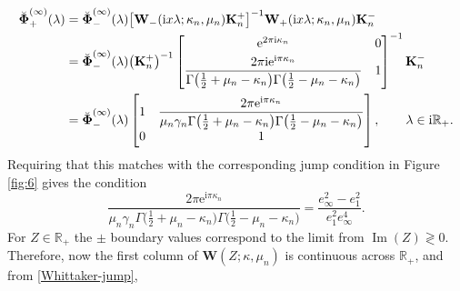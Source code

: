 \documentclass[pdftex]{sigma}
\numberwithin{equation}{section}
\newcommand{\ee}{\mathrm{e}}
\newcommand{\ii}{\mathrm{i}}
\newcommand{\para}[1]{\breve{#1}}
\newcommand{\R}{{\mathbb{R}}}
\newcommand{\im}{\operatorname{Im}}
\begin{document}
\begin{align*}
 \para{\boldsymbol{\Phi}}_+^{(\infty)}(\lambda)&=\para{\boldsymbol{\Phi}}_-^{(\infty)}(\lambda)\big[\mathbf{W}_-(\ii x\lambda;\kappa_n,\mu_n)\mathbf{K}_n^{+}\big]^{-1}\mathbf{W}_+(\ii x\lambda;\kappa_n,\mu_n)\mathbf{K}_n^-\\
 &=\para{\boldsymbol{\Phi}}_-^{(\infty)}(\lambda)
 \big(\mathbf{K}^+_n\big)^{-1}
 \begin{bmatrix}
 \ee^{2\pi \ii\kappa_n} & 0\vspace{1mm}\\
 \displaystyle \frac{2\pi \ii\ee^{\ii\pi\kappa_n}}{\Gamma\big(\frac{1}{2}+\mu_n-\kappa_n\big)\Gamma\big(\frac{1}{2}-\mu_n-\kappa_n\big)} & 1
 \end{bmatrix}^{-1}
 \mathbf{K}^-_n\\
 &=\para{\boldsymbol{\Phi}}_-^{(\infty)}(\lambda)\begin{bmatrix}
 1 & \displaystyle\frac{2\pi \ee^{\ii\pi\kappa_n}}{\mu_n\gamma_n\Gamma\big(\frac{1}{2}+\mu_n-\kappa_n\big)\Gamma\big(\frac{1}{2}-\mu_n-\kappa_n\big)}\\
 0 & 1
 \end{bmatrix},\qquad \lambda\in \ii\mathbb{R}_+.
\end{align*}
Requiring that this matches with the corresponding jump condition in Figure \ref{fig:6} gives the condition
\begin{equation*}%
 \frac{2\pi \ee^{\ii\pi\kappa_n}}{\mu_n\gamma_n\Gamma\big(\frac{1}{2}+\mu_n-\kappa_n\big)\Gamma\big(\frac{1}{2}-\mu_n-\kappa_n\big)} = \frac{e_\infty^2-e_1^2}{e_1^2e_\infty^4}.
\end{equation*}
For $Z\in\R_+$ the $\pm$ boundary values correspond to the limit from $\im(Z)\gtrless 0$. Therefore, now the first column of $\mathbf{W}(Z;\kappa,\mu_n)$ is continuous across $\mathbb{R}_+$, and from \eqref{Whittaker-jump},
\end{document}
